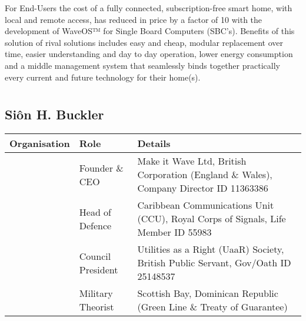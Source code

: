 \documentclass[letterpaper,10pt,openany,oneside,english]{sphinxmanual}
\begin{document}
For End-Users the cost of a fully connected, subscription-free smart home, with local and remote access, has reduced in price by a factor of 10 with the development of WaveOS™ for Single Board Computers (SBC’s). Benefits of this solution of rival solutions includes easy and cheap, modular replacement over time, easier understanding and day to day operation, lower energy consumption and a middle management system that seamlessly binds together practically every current and future technology for their home(s).


\section{}
\label{\detokenize{index:document-author-s}}

\subsection{Siôn H. Buckler}
\label{\detokenize{index:sion-h-buckler}}

\begin{savenotes}\sphinxattablestart
\centering
\begin{tabulary}{\linewidth}[t]{|T|T|T|}
\hline
\sphinxstyletheadfamily 
Organisation
&\sphinxstyletheadfamily 
Role
&\sphinxstyletheadfamily 
Details
\\
\hline
\noindent{}
&
Founder \& CEO
&
Make it Wave Ltd, British Corporation (England \& Wales), Company Director ID 11363386
\\
\hline
\noindent{}
&
Head of Defence
&
Caribbean Communications Unit (CCU), Royal Corps of Signals, Life Member ID 55983
\\
\hline
\noindent{}
&
Council President
&
Utilities as a Right (UaaR) Society, British Public Servant, Gov/Oath ID 25148537
\\
\hline
\noindent{}
&
Military Theorist
&
Scottish Bay, Dominican Republic (Green Line \& Treaty of Guarantee)
\\
\hline
\end{tabulary}
\par
\sphinxattableend\end{savenotes}
\end{document}
